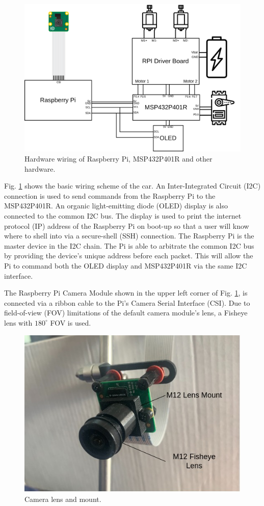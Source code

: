 \documentclass{article}
\begin{document}
\begin{figure}[htb]
	\centering
	\centerline{\includegraphics[width=1.0\linewidth]{wiring}}
	\caption{Hardware wiring of Raspberry Pi, MSP432P401R and other hardware.}
	\label{fig:hardware}
\end{figure}

Fig. \ref{fig:hardware} shows the basic wiring scheme of the car. An Inter-Integrated Circuit (I2C) connection is used to send commands from the Raspberry Pi to the MSP432P401R. An organic light-emitting diode (OLED) display is also connected to the common I2C bus. The display is used to print the internet protocol (IP) address of the Raspberry Pi on boot-up so that a user will know where to shell into via a secure-shell (SSH) connection. The Raspberry Pi is the master device in the I2C chain. The Pi is able to arbitrate the common I2C bus by providing the device's unique address before each packet. This will allow the Pi to command both the OLED display and MSP432P401R via the same I2C interface.

The Raspberry Pi Camera Module shown in the upper left corner of Fig. \ref{fig:hardware}, is connected via a ribbon cable to the Pi's Camera Serial Interface (CSI). Due to field-of-view (FOV) limitations of the default camera module's lens, a Fisheye lens with $180^{\circ}$ FOV is used.

\begin{figure}[htb]
	\centering
	\centerline{\includegraphics[width=0.7\linewidth]{camera_annotated}}
	\caption{Camera lens and mount.}
	\label{fig:camera}
\end{figure}
\end{document}
